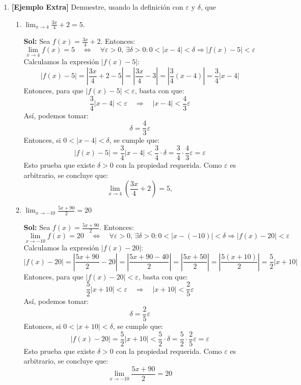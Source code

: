 \documentclass[letterpaper,12pt]{article}
\theoremstyle{plain}
\theoremstyle{definition}
\newcommand{\1}{\mathbbm{1}}
\begin{document}
\begin{enumerate}[label=\textbf{P\arabic*.}, itemsep=0cm]
\item \textbf{[Ejemplo Extra]} Demuestre, usando la definición con \( \varepsilon \) y \( \delta \), que

\begin{enumerate}
\item $\displaystyle \lim_{x \to 4} \frac{3x}{4} + 2 = 5.$

\color{blue}
    \textbf{Sol:} Sea \( f(x) = \frac{3x}{4} + 2 \). Entonces:
\[
\lim_{x \to 4} f(x) = 5
\quad \Leftrightarrow \quad
\forall \varepsilon > 0,\, \exists \delta > 0 : 
0 < |x - 4| < \delta \Rightarrow |f(x) - 5| < \varepsilon
\]
Calculamos la expresión \( |f(x) - 5| \):
\[
|f(x) - 5| = \left| \frac{3x}{4} + 2 - 5 \right| = \left| \frac{3x}{4} - 3 \right| = \left| \frac{3}{4}(x - 4) \right| = \frac{3}{4}|x - 4|
\]
Entonces, para que \( |f(x) - 5| < \varepsilon \), basta con que:
\[
\frac{3}{4}|x - 4| < \varepsilon \quad \Rightarrow \quad |x - 4| < \frac{4}{3} \varepsilon
\]
Así, podemos tomar:
\[
\delta = \frac{4}{3} \varepsilon
\]
Entonces, si \( 0 < |x - 4| < \delta \), se cumple que:
\[
|f(x) - 5| = \frac{3}{4}|x - 4| < \frac{3}{4} \cdot \delta = \frac{3}{4} \cdot \frac{4}{3} \varepsilon = \varepsilon
\]
Esto prueba que existe \( \delta > 0 \) con la propiedad requerida. Como \( \varepsilon \) es arbitrario, se concluye que:
\[
\lim_{x \to 4} \left( \frac{3x}{4} + 2 \right) = 5,
\]
    \color{black}
\item $\displaystyle \lim_{x \to -10} \frac{5x+90}{2} = 20$

\color{blue}
    \textbf{Sol:} Sea \( f(x) = \frac{5x+90}{2} \). Entonces:
\[
\lim_{x \to -10} f(x) = 20
\quad \Leftrightarrow \quad
\forall \varepsilon > 0,\, \exists \delta > 0 : 
0 < |x - (-10)| < \delta \Rightarrow |f(x) - 20| < \varepsilon
\]
Calculamos la expresión \( |f(x) - 20| \):
\[
|f(x) - 20| = \left| \frac{5x + 90}{2} - 20 \right|
= \left| \frac{5x + 90 - 40}{2} \right|
= \left| \frac{5x + 50}{2} \right|
= \left| \frac{5(x + 10)}{2} \right|
= \frac{5}{2} |x + 10|
\]
Entonces, para que \( |f(x) - 20| < \varepsilon \), basta con que:
\[
\frac{5}{2} |x + 10| < \varepsilon \quad \Rightarrow \quad |x + 10| < \frac{2}{5} \varepsilon
\]
Así, podemos tomar:
\[
\delta = \frac{2}{5} \varepsilon
\]
Entonces, si \( 0 < |x + 10| < \delta \), se cumple que:
\[
|f(x) - 20| = \frac{5}{2} |x + 10| < \frac{5}{2} \cdot \delta = \frac{5}{2} \cdot \frac{2}{5} \varepsilon = \varepsilon
\]
Esto prueba que existe \( \delta > 0 \) con la propiedad requerida. Como \( \varepsilon \) es arbitrario, se concluye que:
\[
\lim_{x \to -10} \frac{5x + 90}{2} = 20
\]
    \color{black}


\end{enumerate}
\end{enumerate}
\end{document}
